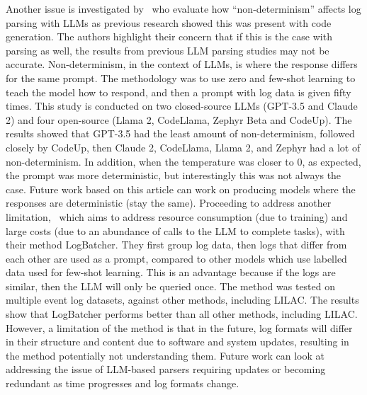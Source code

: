 Another issue is investigated by~\cite{astekin2024exploratory} who evaluate how ``non-determinism'' affects log parsing with LLMs as previous research showed this was present with code generation. The authors highlight their concern that if this is the case with parsing as well, the results from previous LLM parsing studies may not be accurate. Non-determinism, in the context of LLMs, is where the response differs for the same prompt. The methodology was to use zero and few-shot learning to teach the model how to respond, and then a prompt with log data is given fifty times. This study is conducted on two closed-source LLMs (GPT-3.5 and Claude 2) and four open-source (Llama 2, CodeLlama, Zephyr Beta and CodeUp). The results showed that GPT-3.5 had the least amount of non-determinism, followed closely by CodeUp, then Claude 2, CodeLlama, Llama 2, and Zephyr had a lot of non-determinism. In addition, when the temperature was closer to 0, as expected, the prompt was more deterministic, but interestingly this was not always the case. Future work based on this article can work on producing models where the responses are deterministic (stay the same). Proceeding to address another limitation,~\cite{xiao2024stronger} which aims to address resource consumption (due to training) and large costs (due to an abundance of calls to the LLM to complete tasks), with their method LogBatcher. They first group log data, then logs that differ from each other are used as a prompt, compared to other models which use labelled data used for few-shot learning. This is an advantage because if the logs are similar, then the LLM will only be queried once. The method was tested on multiple event log datasets, against other methods, including LILAC. The results show that LogBatcher performs better than all other methods, including LILAC. However, a limitation of the method is that in the future, log formats will differ in their structure and content due to software and system updates, resulting in the method potentially not understanding them. Future work can look at addressing the issue of LLM-based parsers requiring updates or becoming redundant as time progresses and log formats change.


